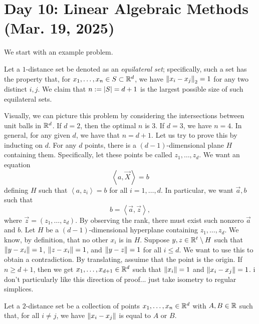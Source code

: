 \section{Day 10: Linear Algebraic Methods (Mar. 19, 2025)}
We start with an example problem.
\begin{simpleclaim}
    Let a $1$-distance set be denoted as an \textit{equilateral set}; specifically, such a set has the property that, for $x_1, \dots, x_n \in S \subset \mathbb R^d$, we have $\left\lVert x_i - x_j \right\rVert_2 = 1$ for any two distinct $i, j$. We claim that $n := \left\lvert S \right\rvert = d + 1$ is the largest possible size of such equilateral sets.
\end{simpleclaim}
\noindent Visually, we can picture this problem by considering the intersections between unit balls in $\mathbb R^d$. If $d = 2$, then the optimal $n$ is $3$. If $d = 3$, we have $n = 4$. In general, for any given $d$, we have that $n = d + 1$. Let us try to prove this by inducting on $d$.
\medskip\newline
For any $d$ points, there is a $(d-1)$-dimensional plane $H$ containing them. Specifically, let these points be called $z_1, \dots, z_d$. We want an equation
\[ \left<a, \vec{X}\right> = b \]
defining $H$ such that $\left<a, z_i\right> = b$ for all $i = 1, \dots, d$. In particular, we want $\vec{a}, b$ such that
\[ b = \left<\vec{a}, \vec{z}\right>, \]
where $\vec{z} = (z_1, \dots, z_d)$. By observing the rank, there must exist such nonzero $\vec{a}$ and $b$. Let $H$ be a $(d-1)$-dimensional hyperplane containing $z_1, \dots, z_d$. We know, by definition, that no other $x_i$ is in $H$. Suppose $y, z \in \mathbb R^t \setminus H$ such that $\left\lVert y - x_i \right\rVert = 1$, $\left\lVert z - x_i \right\rVert = 1$, and $\left\lVert y - z \right\rVert = 1$ for all $i \leq d$. We want to use this to obtain a contradiction. By translating, assuime that the point is the origin. If $n \geq d + 1$, then we get $x_1, \dots, x_{d+1} \in \mathbb R^d$ such that $\left\lVert x_i \right\rVert = 1$ and $\left\lVert x_i - x_j \right\rVert = 1$.
\medskip\newline
i don't particularly like this direction of proof... just take isometry to regular simplices.
\begin{simpleclaim}
    Let a $2$-distance set be a collection of points $x_1, \dots, x_n \in \mathbb R^d$ with $A, B \in \mathbb R$ such that, for all $i \neq j$, we have $\left\lVert x_i - x_j \right\rVert$ is equal to $A$ or $B$.
\end{simpleclaim}
